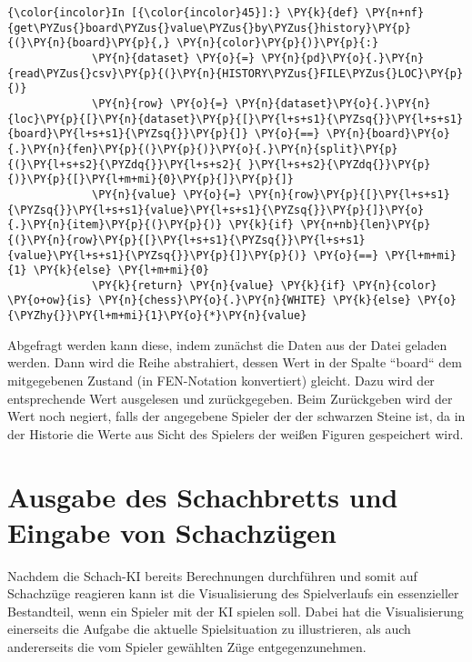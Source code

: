     \begin{Verbatim}[commandchars=\\\{\}]
{\color{incolor}In [{\color{incolor}45}]:} \PY{k}{def} \PY{n+nf}{get\PYZus{}board\PYZus{}value\PYZus{}by\PYZus{}history}\PY{p}{(}\PY{n}{board}\PY{p}{,} \PY{n}{color}\PY{p}{)}\PY{p}{:}
             \PY{n}{dataset} \PY{o}{=} \PY{n}{pd}\PY{o}{.}\PY{n}{read\PYZus{}csv}\PY{p}{(}\PY{n}{HISTORY\PYZus{}FILE\PYZus{}LOC}\PY{p}{)}
             \PY{n}{row} \PY{o}{=} \PY{n}{dataset}\PY{o}{.}\PY{n}{loc}\PY{p}{[}\PY{n}{dataset}\PY{p}{[}\PY{l+s+s1}{\PYZsq{}}\PY{l+s+s1}{board}\PY{l+s+s1}{\PYZsq{}}\PY{p}{]} \PY{o}{==} \PY{n}{board}\PY{o}{.}\PY{n}{fen}\PY{p}{(}\PY{p}{)}\PY{o}{.}\PY{n}{split}\PY{p}{(}\PY{l+s+s2}{\PYZdq{}}\PY{l+s+s2}{ }\PY{l+s+s2}{\PYZdq{}}\PY{p}{)}\PY{p}{[}\PY{l+m+mi}{0}\PY{p}{]}\PY{p}{]}
             \PY{n}{value} \PY{o}{=} \PY{n}{row}\PY{p}{[}\PY{l+s+s1}{\PYZsq{}}\PY{l+s+s1}{value}\PY{l+s+s1}{\PYZsq{}}\PY{p}{]}\PY{o}{.}\PY{n}{item}\PY{p}{(}\PY{p}{)} \PY{k}{if} \PY{n+nb}{len}\PY{p}{(}\PY{n}{row}\PY{p}{[}\PY{l+s+s1}{\PYZsq{}}\PY{l+s+s1}{value}\PY{l+s+s1}{\PYZsq{}}\PY{p}{]}\PY{p}{)} \PY{o}{==} \PY{l+m+mi}{1} \PY{k}{else} \PY{l+m+mi}{0}
             \PY{k}{return} \PY{n}{value} \PY{k}{if} \PY{n}{color} \PY{o+ow}{is} \PY{n}{chess}\PY{o}{.}\PY{n}{WHITE} \PY{k}{else} \PY{o}{\PYZhy{}}\PY{l+m+mi}{1}\PY{o}{*}\PY{n}{value}
\end{Verbatim}

    Abgefragt werden kann diese, indem zunächst die Daten aus der Datei
geladen werden. Dann wird die Reihe abstrahiert, dessen Wert in der
Spalte ``board`` dem mitgegebenen Zustand (in FEN-Notation konvertiert)
gleicht. Dazu wird der entsprechende Wert ausgelesen und zurückgegeben.
Beim Zurückgeben wird der Wert noch negiert, falls der angegebene
Spieler der der schwarzen Steine ist, da in der Historie die Werte aus
Sicht des Spielers der weißen Figuren gespeichert wird.

    \section{Ausgabe des Schachbretts und Eingabe von
Schachzügen}\label{ausgabe-des-schachbretts-und-eingabe-von-schachzuxfcgen}

Nachdem die Schach-KI bereits Berechnungen durchführen und somit auf
Schachzüge reagieren kann ist die Visualisierung des Spielverlaufs ein
essenzieller Bestandteil, wenn ein Spieler mit der KI spielen soll.
Dabei hat die Visualisierung einerseits die Aufgabe die aktuelle
Spielsituation zu illustrieren, als auch andererseits die vom Spieler
gewählten Züge entgegenzunehmen.

